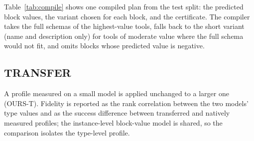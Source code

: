 Table~\ref{tab:compile} shows one compiled plan from the test split: the predicted block values, the variant chosen for
each block, and the certificate. The compiler takes the full schemas of the highest-value tools, falls back to the
short variant (name and description only) for tools of moderate value where the full schema would not fit, and omits
blocks whose predicted value is negative.

\begin{table}[t]\centering\small
\caption{A compiled plan (tool family, Qwen3-4B-Instruct profile, 1k budget): the highest-valued optional blocks, any
other chosen blocks, and the two lowest-valued blocks, with predicted value $\hat v$ and the chosen variant.}\label{tab:compile}
\setlength{\tabcolsep}{3pt}
\resizebox{\columnwidth}{!}{}
\end{table}

\subsection{TRANSFER}
A profile measured on a small model is applied unchanged to a larger one (OURS-T). Fidelity is reported as the rank
correlation between the two models' type values and as the success difference between transferred and natively measured
profiles; the instance-level block-value model is shared, so the comparison isolates the type-level profile.
